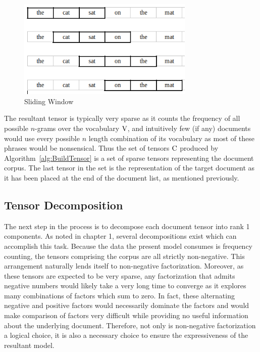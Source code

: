 \documentclass[../ut-dissertation.tex]{subfiles}
\begin{document}
\begin{figure}[p]
  \begin{center}
    \includegraphics[width=0.75\textwidth]{diagrams/sliding-window}
  \end{center}
  \caption{Sliding Window}
  \label{fig:SlidingWindow}
\end{figure}
\FloatBarrier

The resultant tensor is typically very sparse as it counts the
frequency of all possible $n$-grams over the vocabulary $\mathrm{V}$, and
intuitively few (if any) documents would use every possible $n$ length
combination of its vocabulary as most of these phrases would be
nonsensical.  Thus the set of tensors $\mathrm{C}$ produced by
Algorithm~\ref{alg:BuildTensor} is a set of sparse tensors representing
the document corpus.  The last tensor in the set is the representation
of the target document as it has been placed at the end of the
document list, as mentioned previously.

\subsection{Tensor Decomposition}
The next step in the process is to decompose each document tensor into
rank 1 components.  As noted in chapter 1, several decompositions
exist which can accomplish this task.  Because the data the present
model consumes is frequency counting, the tensors comprising the
corpus are all strictly non-negative.  This arrangement naturally
lends itself to non-negative factorization.  Moreover, as these
tensors are expected to be very sparse, any factorization that admits
negative numbers would likely take a very long time to converge as it
explores many combinations of factors which sum to zero.  In fact,
these alternating negative and positive factors would necessarily
dominate the factors and would make comparison of factors very
difficult while providing no useful information about the underlying
document.  Therefore, not only is non-negative factorization a logical
choice, it is also a necessary choice to ensure the expressiveness of
the resultant model.
\end{document}
